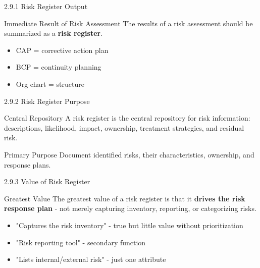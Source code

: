 \documentclass{beamer}
\begin{document}
	\begin{frame}{2.9.1 Risk Register Output}
		\begin{block}{Immediate Result of Risk Assessment}
			The results of a risk assessment should be summarized as a \textbf{risk register}.
		\end{block}
		\begin{itemize}
			\item CAP = corrective action plan
			\item BCP = continuity planning
			\item Org chart = structure
		\end{itemize}
	\end{frame}
	
	\begin{frame}{2.9.2 Risk Register Purpose}
		\begin{block}{Central Repository}
			A risk register is the central repository for risk information: descriptions, likelihood, impact, ownership, treatment strategies, and residual risk.
		\end{block}
		\begin{exampleblock}{Primary Purpose}
			Document identified risks, their characteristics, ownership, and response plans.
		\end{exampleblock}
	\end{frame}
	
	\begin{frame}{2.9.3 Value of Risk Register}
		\begin{block}{Greatest Value}
			The greatest value of a risk register is that it \textbf{drives the risk response plan} - not merely capturing inventory, reporting, or categorizing risks.
		\end{block}
		\begin{itemize}
			\item "Captures the risk inventory" - true but little value without prioritization
			\item "Risk reporting tool" - secondary function
			\item "Lists internal/external risk" - just one attribute
		\end{itemize}
	\end{frame}
	
\end{document}
